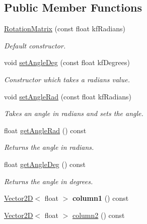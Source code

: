 \subsection*{Public Member Functions}
\begin{DoxyCompactItemize}
\item 
\hypertarget{class_rotation_matrix_a97bcf26df695672b768ec0009355b0fb}{\hyperlink{class_rotation_matrix_a97bcf26df695672b768ec0009355b0fb}{Rotation\+Matrix} (const float kf\+Radians)}\label{class_rotation_matrix_a97bcf26df695672b768ec0009355b0fb}

\begin{DoxyCompactList}\small\item\em Default constructor. \end{DoxyCompactList}\item 
void \hyperlink{class_rotation_matrix_a40d79c7eef78770b19024dc6776ee8c3}{set\+Angle\+Deg} (const float kf\+Degrees)
\begin{DoxyCompactList}\small\item\em Constructor which takes a radians value. \end{DoxyCompactList}\item 
void \hyperlink{class_rotation_matrix_a49c861f624a5a251a013684824cd51de}{set\+Angle\+Rad} (const float kf\+Radians)
\begin{DoxyCompactList}\small\item\em Takes an angle in radians and sets the angle. \end{DoxyCompactList}\item 
float \hyperlink{class_rotation_matrix_a012ca643690e92bf67357f703629010e}{get\+Angle\+Rad} () const 
\begin{DoxyCompactList}\small\item\em Returns the angle in radians. \end{DoxyCompactList}\item 
float \hyperlink{class_rotation_matrix_affe59fa1cb44c08e8341e46383f137c3}{get\+Angle\+Deg} () const 
\begin{DoxyCompactList}\small\item\em Returns the angle in degrees. \end{DoxyCompactList}\item 
\hypertarget{class_rotation_matrix_a5b1f1ef7de82392ae1f295c8356b3261}{\hyperlink{class_vector2_d}{Vector2\+D}$<$ float $>$ {\bfseries column1} () const }\label{class_rotation_matrix_a5b1f1ef7de82392ae1f295c8356b3261}

\item 
\hypertarget{class_rotation_matrix_af54d2979b5913610f33e1867cd8635dd}{\hyperlink{class_vector2_d}{Vector2\+D}$<$ float $>$ \hyperlink{class_rotation_matrix_af54d2979b5913610f33e1867cd8635dd}{column2} () const }\label{class_rotation_matrix_af54d2979b5913610f33e1867cd8635dd}


\end{DoxyCompactItemize}

